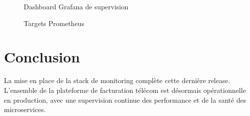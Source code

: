 \begin{figure}[H]
    \centering
    \caption{Dashboard Grafana de supervision}
    \label{fig:grafana_dashboard}
\end{figure}

\begin{figure}[H]
    \centering
    \caption{Targets Prometheus}
    \label{fig:prometheus_targets}
\end{figure}

\section*{Conclusion}
La mise en place de la stack de monitoring complète cette dernière release. L'ensemble de la plateforme de facturation télécom est désormais opérationnelle en production, avec une supervision continue des performance et de la santé des microservices.

\newpage
